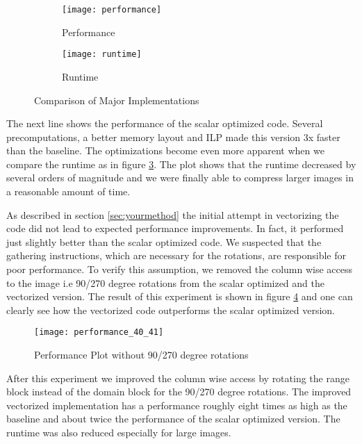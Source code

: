 \begin{figure}
  \begin{subfigure}[t]{\linewidth}
    \centering
    \texttt{[image: performance]}
    \caption{Performance}
    \label{fig:perf}
  \end{subfigure}
  \begin{subfigure}[t]{\linewidth}
    \centering
    \texttt{[image: runtime]}
    \caption{Runtime}
    \label{fig:runtime}
  \end{subfigure}
  \caption{Comparison of Major Implementations}
\end{figure}

The next line shows the performance of the scalar optimized code. Several precomputations, a better
memory layout and ILP made this version 3x faster than the baseline. The optimizations become even 
more apparent when we compare the runtime as in figure \ref{fig:runtime}. The plot shows that the runtime
decreased by several orders of magnitude and we were finally able to compress larger images in a reasonable 
amount of time.


As described in section \ref{sec:yourmethod} the initial attempt in vectorizing the code did not lead
to expected performance improvements. In fact, it performed just slightly better than the scalar optimized code.
We suspected that the gathering instructions, which are necessary for the rotations, are responsible for poor performance. 
To verify this assumption, we removed the column wise access to the image i.e 90/270 degree rotations from the scalar optimized and the vectorized version.
The result of this experiment is shown in figure \ref{fig:perf_40_41} and one can clearly see how the vectorized
code outperforms the scalar optimized version.

\begin{figure}
  \centering
  \texttt{[image: performance\_40\_41]}
  \caption{Performance Plot without 90/270 degree rotations}
  \label{fig:perf_40_41}
\end{figure}

After this experiment we improved the column wise access by rotating the range 
block instead of the domain block for the 90/270 degree rotations. The improved 
vectorized implementation has a performance roughly eight times as high as the 
baseline and about twice the performance of the scalar optimized version. The 
runtime was also reduced especially for large images.

